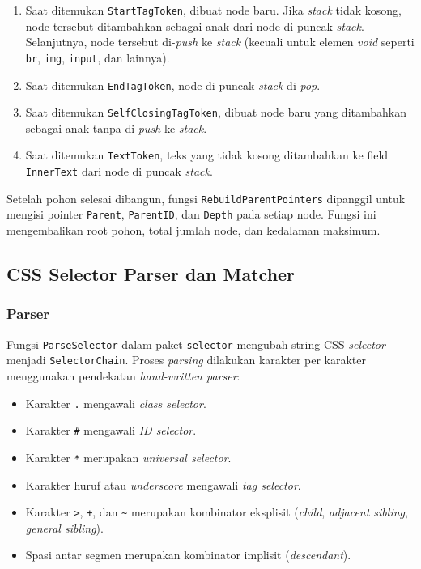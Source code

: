\begin{enumerate}
    \item Saat ditemukan \texttt{StartTagToken}, dibuat node baru. Jika \textit{stack} tidak kosong, node tersebut ditambahkan sebagai anak dari node di puncak \textit{stack}. Selanjutnya, node tersebut di-\textit{push} ke \textit{stack} (kecuali untuk elemen \textit{void} seperti \texttt{br}, \texttt{img}, \texttt{input}, dan lainnya).
    \item Saat ditemukan \texttt{EndTagToken}, node di puncak \textit{stack} di-\textit{pop}.
    \item Saat ditemukan \texttt{SelfClosingTagToken}, dibuat node baru yang ditambahkan sebagai anak tanpa di-\textit{push} ke \textit{stack}.
    \item Saat ditemukan \texttt{TextToken}, teks yang tidak kosong ditambahkan ke field \texttt{InnerText} dari node di puncak \textit{stack}.
\end{enumerate}

Setelah pohon selesai dibangun, fungsi \texttt{RebuildParentPointers} dipanggil untuk mengisi pointer \texttt{Parent}, \texttt{ParentID}, dan \texttt{Depth} pada setiap node. Fungsi ini mengembalikan root pohon, total jumlah node, dan kedalaman maksimum.

\subsection{CSS Selector Parser dan Matcher}

\subsubsection{Parser}

Fungsi \texttt{ParseSelector} dalam paket \texttt{selector} mengubah string CSS \textit{selector} menjadi \texttt{SelectorChain}. Proses \textit{parsing} dilakukan karakter per karakter menggunakan pendekatan \textit{hand-written parser}:

\begin{itemize}
    \item Karakter \texttt{.} mengawali \textit{class selector}.
    \item Karakter \texttt{\#} mengawali \textit{ID selector}.
    \item Karakter \texttt{*} merupakan \textit{universal selector}.
    \item Karakter huruf atau \textit{underscore} mengawali \textit{tag selector}.
    \item Karakter \texttt{>}, \texttt{+}, dan \texttt{\textasciitilde} merupakan kombinator eksplisit (\textit{child}, \textit{adjacent sibling}, \textit{general sibling}).
    \item Spasi antar segmen merupakan kombinator implisit (\textit{descendant}).
\end{itemize}

